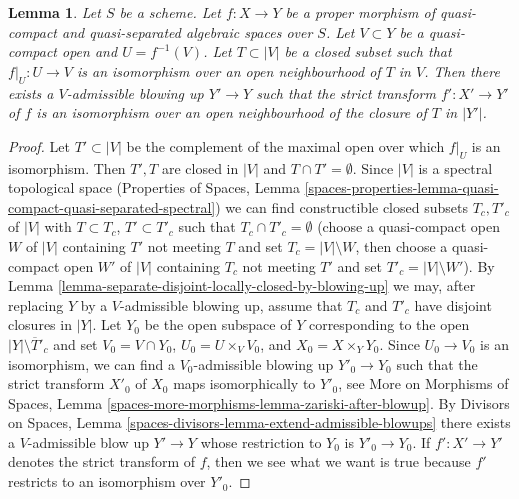 \documentclass[10pt,a4paper]{amsart}
\theoremstyle{plain}
\newtheorem{lemma}[subsection]{Lemma}
\theoremstyle{definition}
\theoremstyle{remark}
\numberwithin{equation}{subsection}
\begin{document}
\begin{lemma}
\label{lemma-blowup-iso-along}
Let $S$ be a scheme. Let $f : X \to Y$ be a proper morphism of quasi-compact
and quasi-separated algebraic spaces over $S$. Let $V \subset Y$ be a
quasi-compact open and $U = f^{-1}(V)$. Let $T \subset |V|$ be a closed subset
such that $f|_U : U \to V$ is an isomorphism over an open neighbourhood of $T$
in $V$. Then there exists a $V$-admissible blowing up $Y' \to Y$ such that
the strict transform $f' : X' \to Y'$ of $f$ is an isomorphism over an open
neighbourhood of the closure of $T$ in $|Y'|$.
\end{lemma}

\begin{proof}
Let $T' \subset |V|$ be the complement of the maximal open over which
$f|_U$ is an isomorphism. Then $T', T$ are closed in $|V|$ and
$T \cap T' = \emptyset$. Since $|V|$ is a spectral topological space
(Properties of Spaces, Lemma
\ref{spaces-properties-lemma-quasi-compact-quasi-separated-spectral})
we can find constructible closed subsets $T_c, T'_c$ of $|V|$
with $T \subset T_c$, $T' \subset T'_c$ such that
$T_c \cap T'_c = \emptyset$ (choose a quasi-compact
open $W$ of $|V|$ containing $T'$ not meeting $T$
and set $T_c = |V| \setminus W$, then choose a quasi-compact
open $W'$ of $|V|$ containing $T_c$ not meeting $T'$
and set $T'_c = |V| \setminus W'$).
By Lemma \ref{lemma-separate-disjoint-locally-closed-by-blowing-up}
we may, after replacing $Y$ by a $V$-admissible blowing up,
assume that $T_c$ and $T'_c$ have disjoint closures in $|Y|$.
Let $Y_0$ be the open subspace of $Y$ corresponding to the open
$|Y| \setminus \overline{T}'_c$ and set $V_0 = V \cap Y_0$,
$U_0 = U \times_V V_0$, and $X_0 = X \times_Y Y_0$.
Since $U_0 \to V_0$ is an isomorphism, we can find a
$V_0$-admissible blowing up $Y'_0 \to Y_0$ such that the
strict transform $X'_0$ of $X_0$ maps isomorphically to $Y'_0$, see
More on Morphisms of Spaces, Lemma
\ref{spaces-more-morphisms-lemma-zariski-after-blowup}.
By Divisors on Spaces, Lemma
\ref{spaces-divisors-lemma-extend-admissible-blowups}
there exists a $V$-admissible blow up $Y' \to Y$ whose restriction
to $Y_0$ is $Y'_0 \to Y_0$. If $f' : X' \to Y'$ denotes the
strict transform of $f$, then we see what we want is true because
$f'$ restricts to an isomorphism over $Y'_0$.
\end{proof}
\end{document}
